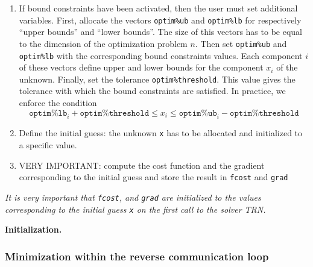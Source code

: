 \documentclass[a4paper,twoside,final,onecolumn,11pt,openright]{article}
\begin{document}
\begin{enumerate}
\item If bound constraints have been activated, then the user must set additional variables. First, allocate the vectors \texttt{optim\%ub} and \texttt{optim\%lb} for respectively ``upper bounds'' and ``lower bounds''. The size of this vectors has to be equal to the dimension of the optimization problem $n$. Then set \texttt{optim\%ub} and \texttt{optim\%lb} with the corresponding bound constraints values. Each component $i$ of these vectors define upper and lower bounds for the component $x_i$ of the unknown. Finally, set the tolerance \texttt{optim\%threshold}. This value gives the tolerance with which the bound constraints are satisfied. In practice, we enforce the condition
\begin{equation}
 \texttt{optim\%lb}_i + \texttt{optim\%threshold} \leq x_i \leq \texttt{optim\%ub}_i - \texttt{optim\%threshold}
\end{equation}
\item Define the initial guess: the unknown \texttt{x} has to be allocated and initialized to a specific value. 
\item VERY IMPORTANT: compute the cost function and the gradient corresponding to the initial guess and store the result in \texttt{fcost} and \texttt{grad} 
\end{enumerate}
\textit{
It is very important that \texttt{fcost}, and \texttt{grad} are initialized to the values corresponding to the initial guess \texttt{x} on the first call to the solver TRN.}

\framebox{
\small
 
}
\normalsize
\begin{center}
\textbf{Initialization.} 
\end{center}

\subsubsection{Minimization within the reverse communication loop}
\end{document}
